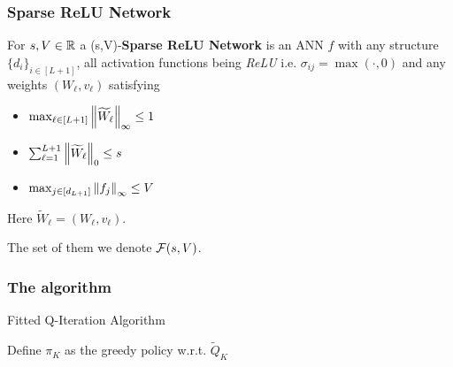 \documentclass{beamer}
\begin{document}
\begin{frame}
	\frametitle{Sparse ReLU Network}
	\begin{definition}
		For $s,V \in \mathbb{R}$ a (s,V)-\textbf{Sparse ReLU Network} is an ANN $f$
		with any structure $\{d_i\}_{i\in [L+1]}$,
		all activation functions being \emph{ReLU} i.e. $\sigma_{ij} = \max(\cdot, 0)$
		and any weights $(W_\ell, v_\ell)$
		satisfying
		\begin{itemize}
			\item $\max_{\ell \in [L+1]} \left\lVert\widetilde{W}_\ell\right\rVert_\infty \leq 1$
			\item $\sum_{\ell = 1}^{L+1} \left\lVert\widetilde{W}_\ell\right\rVert_0 \leq s$
			\item $\max_{j \in [d_{L+1}]} \left\lVert f_j\right\rVert_\infty \leq V$
		\end{itemize}
		Here $\widetilde{W}_\ell = (W_\ell, v_\ell)$.

		The set of them we denote $\mathcal{F}(s,V)$.
	\end{definition}
\end{frame}

\begin{frame}
	\frametitle{The algorithm}
	\begin{algorithm}[H]
		\caption{Fitted Q-Iteration Algorithm}
		Define $\pi_K$ as the greedy policy w.r.t. $\widetilde{Q}_K$ \\
	\end{algorithm}
\end{frame}
\end{document}
